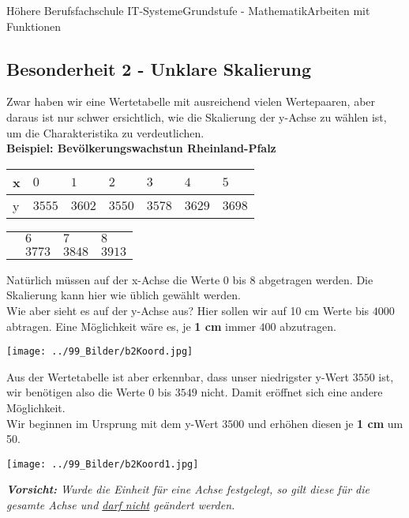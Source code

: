\documentclass[11pt,twocolumn,oneside,openany,headings=optiontotoc,11pt,numbers=noenddot]{article}
\begin{document}
\begin{worksheet}{Höhere Berufsfachschule IT-Systeme}{Grundstufe - Mathematik}{Arbeiten mit Funktionen}
		\subsection{Besonderheit 2 - Unklare Skalierung}
		Zwar haben wir eine Wertetabelle mit ausreichend vielen Wertepaaren, aber daraus ist nur schwer ersichtlich, wie die Skalierung der y-Achse zu wählen ist, um die Charakteristika zu verdeutlichen.\\
		\textbf{Beispiel: Bevölkerungswachstun Rheinland-Pfalz}\\
		\begin{tabularx}{0.49\textwidth}{|l|X|X|X|X|X|X|}
			\hline
			x & \(0\) & \(1\) & \(2\) & \(3\) & \(4\) & \(5\)\\
			\hline
			y & \(3555\) & \(3602\) & \(3550\) & \(3578\) & \(3629\) & \(3698\)\\
			\hline
		\end{tabularx}
		\par\bigskip\noindent
		\begin{tabularx}{0.5\textwidth}{l|l|l|l|}
			\cline{2-4}
			& \(6\) & \(7\) & \(8\)\\
			\cline{2-4}
			& \(3773\) & \(3848\) & \(3913\)\\
			\cline{2-4}
		\end{tabularx}
		\par\bigskip\noindent
		Natürlich müssen auf der x-Achse die Werte 0 bis 8 abgetragen werden. Die Skalierung kann hier wie üblich gewählt werden.\\
		Wie aber sieht es auf der y-Achse aus? Hier sollen wir auf 10 cm Werte bis \(4000\) abtragen. Eine Möglichkeit wäre es, je \textbf{1 cm} immer \(400\) abzutragen.\\
		\par\bigskip\noindent
		\texttt{[image: ../99\_Bilder/b2Koord.jpg]}\\
		\par\bigskip\noindent
		Aus der Wertetabelle ist aber erkennbar, dass unser niedrigster y-Wert \(3550\) ist, wir benötigen also die Werte 0 bis \(3549\) nicht. Damit eröffnet sich eine andere Möglichkeit.\\
		Wir beginnen im Ursprung mit dem y-Wert \(3500\) und erhöhen diesen je \textbf{1 cm} um 50.\\
		\par\bigskip\noindent
		\texttt{[image: ../99\_Bilder/b2Koord1.jpg]}\\
		\par\bigskip\noindent
		\textit{\textbf{Vorsicht:} Wurde die Einheit für eine Achse festgelegt, so gilt diese für die gesamte Achse und \underline{darf nicht} geändert werden.}
	\end{worksheet}
\end{document}

